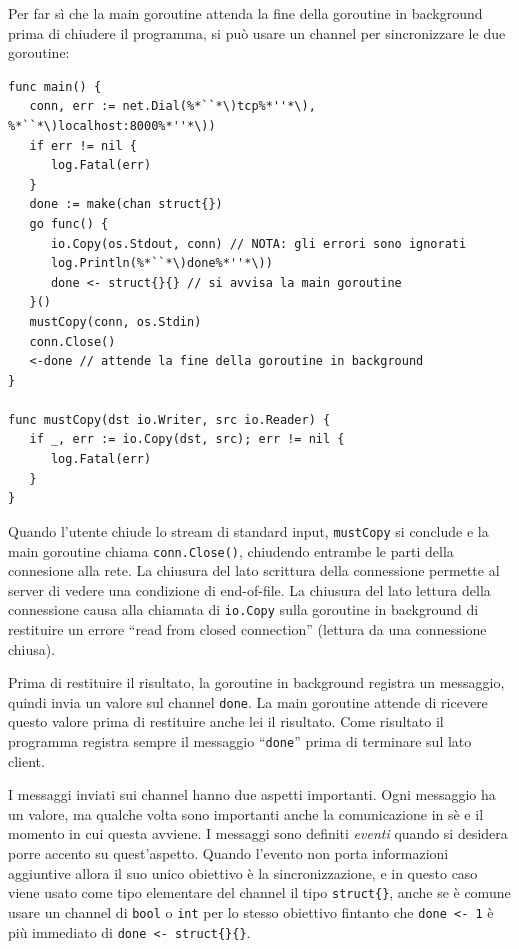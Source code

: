 Per far sì che la main goroutine attenda la fine della goroutine in background prima di chiudere il programma, si può usare un channel per sincronizzare le due goroutine:
\begin{lstlisting}[frame=single, label={lst:lstlisting7-4-1.1}]
func main() {
   conn, err := net.Dial(%*``*\)tcp%*''*\), %*``*\)localhost:8000%*''*\))
   if err != nil {
      log.Fatal(err)
   }
   done := make(chan struct{})
   go func() {
      io.Copy(os.Stdout, conn) // NOTA: gli errori sono ignorati
      log.Println(%*``*\)done%*''*\))
      done <- struct{}{} // si avvisa la main goroutine
   }()
   mustCopy(conn, os.Stdin)
   conn.Close()
   <-done // attende la fine della goroutine in background
}

func mustCopy(dst io.Writer, src io.Reader) {
   if _, err := io.Copy(dst, src); err != nil {
      log.Fatal(err)
   }
}
\end{lstlisting}
Quando l'utente chiude lo stream di standard input, \verb|mustCopy| si conclude e la main goroutine chiama \verb|conn.Close()|, chiudendo entrambe le parti della connesione alla rete.
La chiusura del lato scrittura della connessione permette al server di vedere una condizione di end-of-file.
La chiusura del lato lettura della connessione causa alla chiamata di \verb|io.Copy| sulla goroutine in background di restituire un errore ``read from closed connection'' (lettura da una connessione chiusa).

Prima di restituire il risultato, la goroutine in background registra un messaggio, quindi invia un valore sul channel \verb|done|.
La main goroutine attende di ricevere questo valore prima di restituire anche lei il risultato.
Come risultato il programma registra sempre il messaggio ``\verb|done|'' prima di terminare sul lato client.

I messaggi inviati sui channel hanno due aspetti importanti.
Ogni messaggio ha un valore, ma qualche volta sono importanti anche la comunicazione in sè e il momento in cui questa avviene.
I messaggi sono definiti \textit{eventi} quando si desidera porre accento su quest'aspetto.
Quando l'evento non porta informazioni aggiuntive allora il suo unico obiettivo è la sincronizzazione, e in questo caso viene usato come tipo elementare del channel il tipo \verb|struct{}|, anche se è comune usare un channel di \verb|bool| o \verb|int| per lo stesso obiettivo fintanto che \verb|done <- 1| è più immediato di \verb|done <- struct{}{}|.

